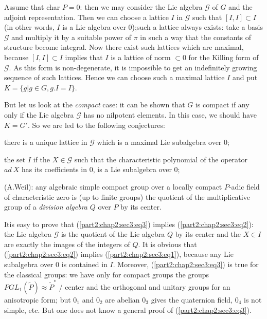   Assume that char $P =0$: then we may consider the Lie algebra
  $\mathscr{G}$ of $G$ and the adjoint representation. Then we can
  choose a lattice $I$ in $\mathscr{G}$ such that $[I,I] \subset I$
  (in other words, $I$ is a Lie algebra over $0$);such a lattice
  always exists: take a basis $\mathscr{G}$ and multiply it by a
  suitable power of $\pi$ in such a way that the constants of
  structure become integral. Now there exist such lattices which are
  maximal, because $[I,I]\subset I$ implies that $I$ is a lattice of
  norm $\subset 0$ for the Killing form of $\mathscr{G}$. As this form
  is non-degenerate, it is impossible to get an indefinitely growing
  sequence of such lattices. Hence we can choose such a maximal
  lattice $I$ and put $K = \{ g | g \in G, g.I = I\}$. 

  But let us look at the \textit{compact} case: it can be shown that $G$
  is compact if any only if the Lie algebra $\mathscr{G}$ has no
  nilpotent elements. In this case, we should have $K = G'$. So we are
  led to the following conjectures: 
  \begin{Conjecture}\label{part2:chap2:sec5:conj1}%
    there is a unique lattice in $\mathscr{G}$ which is a maximal Lie
    subalgebra over $0$; 
  \end{Conjecture}
  
  \begin{Conjecture}\label{part2:chap2:sec5:conj2}%
    the set $I$ if the $X \in \mathscr{G}$ such that the characteristic
    polynomial of the operator $ad ~X$ has its coefficients in $0$, is a
    Lie subalgebra over $0$; 
  \end{Conjecture}
  
  \begin{Conjecture}\label{part2:chap2:sec5:conj3}%
    (A.Weil): any algebraic simple compact group over a locally compact
    $P$-adic field of characteristic zero is (up to finite groups) the
    quotient of the multiplicative group of a {\em division algebra}
    $Q$ over $P$ by its center. 
  \end{Conjecture}
  
  It\pageoriginale is easy to prove that (\ref{part2:chap2:sec3:eq3})
  implies (\ref{part2:chap2:sec3:eq2}): the Lie algebra 
  $\mathscr{G}$ is the quotient of the Lie algebra $Q$ by its center and
  the $X \in I$ are exactly the images of the integers of $Q$. It is
  obvious that (\ref{part2:chap2:sec3:eq2}) implies
  (\ref{part2:chap2:sec3:eq1}), because any 
  Lie subalgebra over $0$ is 
  contained in $I$. Moreover, (\ref{part2:chap2:sec3:eq3}) is true for the classical groups: we
  have only for compact groups the groups $PGL_1(\tilde{P})\approx
  \tilde{P}^* $ / center and the orthogonal and unitary groups for an
  anisotropic form; but $0_1$ and $0_2$ are abelian $0_3$ gives the
  quaternion field, $0_4$ is not simple, etc. But one does not know a
  general proof of (\ref{part2:chap2:sec3:eq3}). 
  
